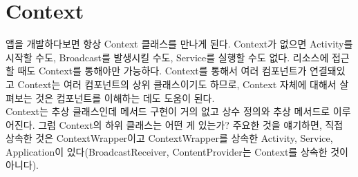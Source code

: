 \chapter{Context}
앱을 개발하다보면 항상 Context 클래스를 만나게 된다. Context가 없으면 Activity를 시작할 수도, Broadcast를 발생시킬 수도, Service를 실행할 수도 없다. 리소스에 접근할 때도 Context를 통해야만 가능하다.
Context를 통해서 여러 컴포넌트가 연결돼있고 Context는 여러 컴포넌트의 상위 클래스이기도 하므로, Context 자체에 대해서 살펴보는 것은 컴포넌트를 이해하는 데도 도움이 된다.\\

Context는 추상 클래스인데 메서드 구현이 거의 없고 상수 정의와 추상 메서드로 이루어진다. 
그럼 Context의 하위 클래스는 어떤 게 있는가? 주요한 것을 얘기하면, 직접 상속한 것은 ContextWrapper이고 ContextWrapper를 상속한 Activity, Service, Application이 있다(BroadcastReceiver, ContentProvider는 Context를 상속한 것이 아니다).\\



